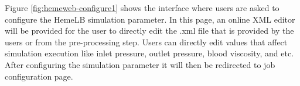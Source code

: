 \noindent%
\begin{minipage}{\linewidth}%
\label{fig:hemeweb-configure1}%
\end{minipage}

\vspace{1cm}

Figure \ref{fig:hemeweb-configure1} shows the interface where users are asked to configure the HemeLB simulation parameter. In this page, an online XML editor will be provided for the user to directly edit the .xml file that is provided by the users or from the  pre-processing step. Users can directly edit values that affect simulation execution like inlet pressure, outlet pressure, blood viscosity, and etc. After configuring the simulation parameter it will then be redirected to job configuration page.



\vspace{1cm}

\noindent%
\begin{minipage}{\linewidth}%
\label{fig:hemeweb-configure2}%
\end{minipage}

